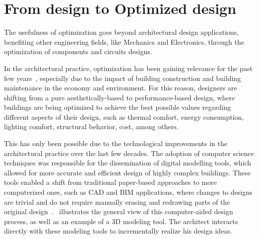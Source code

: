\section{From design to Optimized design}
	
	The usefulness of optimization goes beyond architectural design applications, benefiting other engineering fields, like Mechanics and Electronics, through the optimization of components and circuits designs. 
	
	In the architectural practice, optimization has been gaining relevance for the past few years~\cite{Cichocka2017SURVEY}, especially due to the impact of building construction and building maintenance in the economy and environment. For this reason, designers are shifting from a pure aesthetically-based to performance-based design, where buildings are being optimized to achieve the best possible values regarding different aspects of their design, such as thermal comfort, energy consumption, lighting comfort, structural behavior, cost, among others.

	This has only been possible due to the technological improvements in the architectural practice over the last few decades. The adoption of computer science techniques was responsible for the dissemination of digital modelling tools, which allowed for more accurate and efficient design of highly complex buildings. These tools enabled a shift from traditional paper-based approaches to more computerized ones, such as \ac{CAD} and \ac{BIM} applications, where changes to designs are trivial and do not require manually erasing and redrawing parts of the original design~\cite{Ferreira2015GD}.~ illustrates the general view of this computer-aided design process, as well as an example of a 3D modeling tool. The architect interacts directly with these modeling tools to incrementally realize his design ideas.
	
